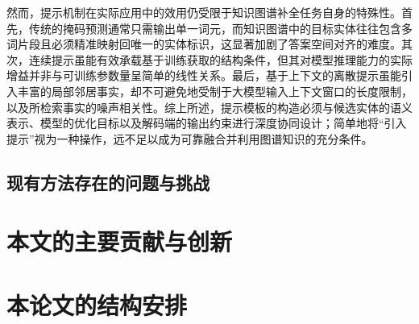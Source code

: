 然而，提示机制在实际应用中的效用仍受限于知识图谱补全任务自身的特殊性。首先，传统的掩码预测通常只需输出单一词元，而知识图谱中的目标实体往往包含多词片段且必须精准映射回唯一的实体标识，这显著加剧了答案空间对齐的难度。其次，连续提示虽能有效承载基于训练获取的结构条件，但其对模型推理能力的实际增益并非与可训练参数量呈简单的线性关系。最后，基于上下文的离散提示虽能引入丰富的局部邻居事实，却不可避免地受制于大模型输入上下文窗口的长度限制，以及所检索事实的噪声相关性。综上所述，提示模板的构造必须与候选实体的语义表示、模型的优化目标以及解码端的输出约束进行深度协同设计；简单地将“引入提示”视为一种操作，远不足以成为可靠融合并利用图谱知识的充分条件。

\subsection{现有方法存在的问题与挑战}






\section{本文的主要贡献与创新}

\section{本论文的结构安排}
